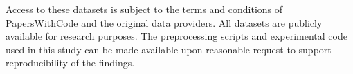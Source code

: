 \documentclass[11pt]{article}
\begin{document}
Access to these datasets is subject to the terms and conditions of PapersWithCode and the original data providers. All datasets are publicly available for research purposes. The preprocessing scripts and experimental code used in this study can be made available upon reasonable request to support reproducibility of the findings.

\newpage
\printbibliography
\end{document}
